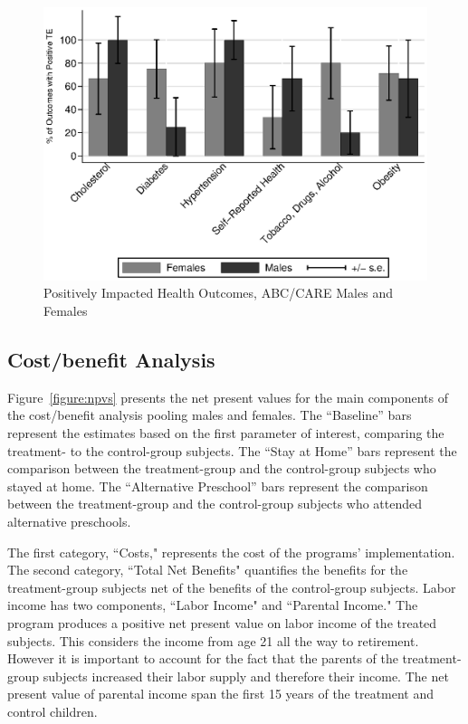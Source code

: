 \begin{figure}[H]
		\caption{Positively Impacted Health Outcomes, ABC/CARE Males and Females} \label{fig:ppositivecategory2}
		\includegraphics[width=.78\columnwidth]{output/itt_noctrl_cats2.eps}
\end{figure}

\subsection{Cost/benefit Analysis} \label{section:cbaresults}

Figure~\ref{figure:npvs} presents the net present values for the main components of the cost/benefit analysis pooling males and females. The ``Baseline'' bars represent the estimates based on the first parameter of interest, comparing the treatment- to the control-group subjects. The ``Stay at Home'' bars represent the comparison between the treatment-group and the control-group subjects who stayed at home. The ``Alternative Preschool'' bars represent the comparison between the treatment-group and the control-group subjects who attended alternative preschools.

The first category, ``Costs," represents the cost of the programs' implementation. The second category, ``Total Net Benefits" quantifies the benefits for the treatment-group subjects net of the benefits of the control-group subjects. Labor income has two components, ``Labor Income" and ``Parental Income." The program produces a positive net present value on labor income of the treated subjects. This considers the income from age 21 all the way to retirement. However it is important to account for the fact that the parents of the treatment-group subjects increased their labor supply and therefore their income. The net present value of parental income span the first 15 years of the treatment and control children.

